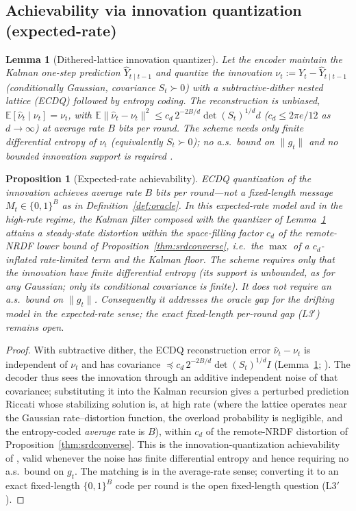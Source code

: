 \documentclass[11pt]{article}
\newtheorem{lemma}{Lemma}
\newtheorem{proposition}{Proposition}
\theoremstyle{definition}
\newcommand{\E}{\mathbb{E}}
\begin{document}
\subsection{Achievability via innovation quantization (expected-rate)}\label{app:seqrd:ach}
\begin{lemma}[Dithered-lattice innovation quantizer]
\label{lem:innovation}
Let the encoder maintain the Kalman one-step prediction $\hat Y_{t\mid t-1}$ and quantize the innovation
$\nu_t:=Y_t-\hat Y_{t\mid t-1}$ (conditionally Gaussian, covariance $S_t\succ0$) with a subtractive-dither
nested lattice (ECDQ) followed by entropy coding. The reconstruction is unbiased,
$\E[\hat\nu_t\mid\nu_t]=\nu_t$, with $\E\|\hat\nu_t-\nu_t\|^2\le c_d\,2^{-2B/d}\det(S_t)^{1/d}d$
($c_d\le 2\pi e/12$ as $d\to\infty$) at \emph{average} rate $B$ bits per round. The scheme needs only
finite differential entropy of $\nu_t$ (equivalently $S_t\succ0$); no a.s.\ bound on $\|g_t\|$ and no
bounded innovation support is required \citep{zamir1998nested,kostina2019ratecost}.
\end{lemma}

\begin{proposition}[Expected-rate achievability]
\label{thm:seqach}
ECDQ quantization of the innovation achieves \emph{average} rate $B$ bits per round---not a fixed-length
message $M_t\in\{0,1\}^B$ as in Definition~\ref{def:oracle}. In this \emph{expected-rate} model and in
the high-rate regime, the Kalman filter composed with the quantizer of Lemma~\ref{lem:innovation}
attains a steady-state distortion within the space-filling factor $c_d$ of the remote-NRDF lower bound
of Proposition~\ref{thm:srdconverse}, i.e.\ the $\max$ of a $c_d$-inflated rate-limited term and the
Kalman floor. The scheme requires only that the innovation have finite differential entropy (its
\emph{support} is unbounded, as for any Gaussian; only its conditional covariance is finite). It does
not require an a.s.\ bound on $\|g_t\|$. Consequently it addresses the oracle gap for the drifting model
in the \emph{expected-rate} sense; the exact fixed-length per-round gap (L3$'$) remains open.
\end{proposition}
\begin{proof}
With subtractive dither, the ECDQ reconstruction error $\hat\nu_t-\nu_t$ is independent of $\nu_t$ and
has covariance $\preceq c_d\,2^{-2B/d}\det(S_t)^{1/d}I$ (Lemma~\ref{lem:innovation};
\citealp{zamir1998nested}). The decoder thus sees the innovation through an additive independent noise
of that covariance; substituting it into the Kalman recursion gives a perturbed prediction Riccati whose
stabilizing solution is, at high rate (where the lattice operates near the Gaussian rate--distortion
function, the overload probability is negligible, and the entropy-coded \emph{average} rate is $B$),
within $c_d$ of the remote-NRDF distortion of Proposition~\ref{thm:srdconverse}. This is the
innovation-quantization achievability of \citet{kostina2019ratecost}, valid whenever the noise has
finite differential entropy and hence requiring no a.s.\ bound on $g_t$. The matching is in the
average-rate sense; converting it to an exact fixed-length $\{0,1\}^B$ code per round is the open
fixed-length question (L3$'$).
\end{proof}
\end{document}
